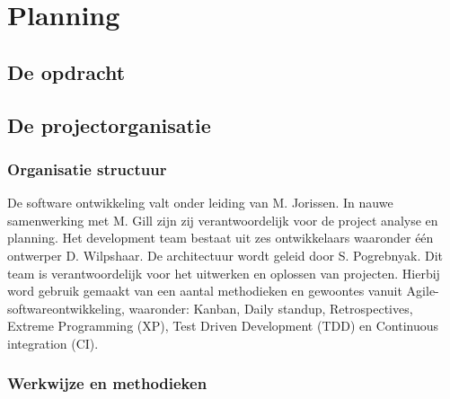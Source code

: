 \chapter{Planning} %

\section{De opdracht} %

\section{De projectorganisatie} %

    \subsection{Organisatie structuur}

    De software ontwikkeling valt onder leiding van M. Jorissen. In nauwe samenwerking met M. Gill zijn zij verantwoordelijk voor de project analyse en planning. Het development team bestaat uit zes ontwikkelaars waaronder één ontwerper D. Wilpshaar.
    De architectuur wordt geleid door S. Pogrebnyak. Dit team is verantwoordelijk voor het uitwerken en oplossen van projecten. Hierbij word gebruik gemaakt van een aantal methodieken en gewoontes vanuit Agile-softwareontwikkeling, waaronder: Kanban, Daily standup, Retrospectives, Extreme Programming (XP), Test Driven Development (TDD) en Continuous integration (CI).

    \subsection{Werkwijze en methodieken}

